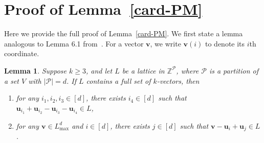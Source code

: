 \documentclass[11pt, letterpaper]{amsart}
\theoremstyle{plain}
\numberwithin{equation}{section}
\newtheorem{lemma}[thm]{Lemma}
\theoremstyle{definition}
\newcommand\card[1]{\left| #1 \right|}
\renewcommand{\vec}[1]{{\mathbf #1}}
\begin{document}
    
    
    
    \appendix
    \section{Proof of Lemma~\ref{card-PM}}
    
    Here we provide the full proof of Lemma~\ref{card-PM}. 
    We first state a lemma analogous to Lemma 6.1 from~\cite{keevash2013polynomial}. For a vector \(\vec{v}\), we write \(\vec{v}(i)\) to denote its \(i\)th coordinate. 
    \begin{lemma}\label{lem:full set}
        Suppose $k\ge 3$, and let $L$ be a lattice in $\mathbb{Z}^{\mathcal{P}}$, where $\mathcal{P}$ is a partition of a set $V$ with \(\card{\mathcal{P}}=d\). If $L$ contains a full set of $k$-vectors, then 
        \begin{enumerate}[label=(A\arabic*)]
            \item for any \(i_1, i_2, i_3\in [d]\), there exists \(i_4\in [d]\) such that \(\vec{u}_{i_1}+\vec{u}_{i_2}-\vec{u}_{i_3}-\vec{u}_{i_4}\in L\),\label{item:A1}
            \item for any \(\vec{v}\in L_{\max}^{d}\) and \(i\in [d]\), there exists \(j\in [d]\) such that \(\vec{v}-\vec{u}_{i}+\vec{u}_{j}\in L\).\label{item:A2}
        \end{enumerate}
    \end{lemma}
\end{document}
